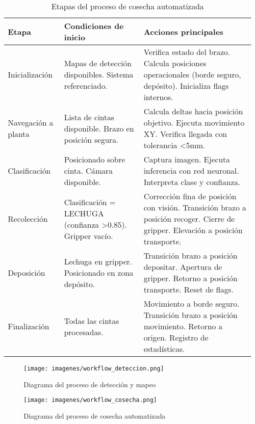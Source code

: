 \begin{table}[H]
\centering
\small
\begin{tabular}{|l|p{5.5cm}|p{5cm}|}
\hline
\textbf{Etapa} & \textbf{Condiciones de inicio} & \textbf{Acciones principales} \\
\hline
Inicialización & Mapas de detección disponibles. Sistema referenciado. & Verifica estado del brazo. Calcula posiciones operacionales (borde seguro, depósito). Inicializa flags internos. \\
\hline
Navegación a planta & Lista de cintas disponible. Brazo en posición segura. & Calcula deltas hacia posición objetivo. Ejecuta movimiento XY. Verifica llegada con tolerancia <5mm. \\
\hline
Clasificación & Posicionado sobre cinta. Cámara disponible. & Captura imagen. Ejecuta inferencia con red neuronal. Interpreta clase y confianza. \\
\hline
Recolección & Clasificación = LECHUGA (confianza >0.85). Gripper vacío. & Corrección fina de posición con visión. Transición brazo a posición recoger. Cierre de gripper. Elevación a posición transporte. \\
\hline
Deposición & Lechuga en gripper. Posicionado en zona depósito. & Transición brazo a posición depositar. Apertura de gripper. Retorno a posición transporte. Reset de flags. \\
\hline
Finalización & Todas las cintas procesadas. & Movimiento a borde seguro. Transición brazo a posición movimiento. Retorno a origen. Registro de estadísticas. \\
\hline
\end{tabular}
\caption{Etapas del proceso de cosecha automatizada}
\label{tab:proceso_cosecha}
\end{table}

\begin{figure}[H]
    \centering
    \texttt{[image: imagenes/workflow\_deteccion.png]}
    \caption{Diagrama del proceso de detección y mapeo}
    \label{fig:workflow_deteccion}
\end{figure}

\begin{figure}[H]
    \centering
    \texttt{[image: imagenes/workflow\_cosecha.png]}
    \caption{Diagrama del proceso de cosecha automatizada}
    \label{fig:workflow_cosecha}
\end{figure}
